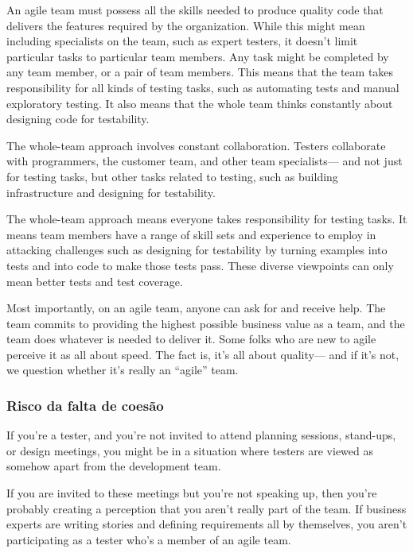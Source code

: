 \documentclass[
	12pt,				%
	openright,			%
	oneside,			%
	a4paper,			%
	english,			%
	brazil,				%
	]{abntex2}
\begin{document}
An agile team must possess all the skills needed to produce quality code that delivers the features required by the organization. While this might mean including specialists on the team, such as expert testers, it doesn’t limit particular tasks to particular team members. Any task might be completed by any team member, or a pair of team members. This means that the team takes responsibility for all kinds of testing tasks, such as automating tests and manual exploratory testing. It also means that the whole team thinks constantly about designing code for testability.

The whole-team approach involves constant collaboration. Testers collaborate with programmers, the customer team, and other team specialists— and not just for testing tasks, but other tasks related to testing, such as building infrastructure and designing for testability.

The whole-team approach means everyone takes responsibility for testing tasks. It means team members have a range of skill sets and experience to employ in attacking challenges such as designing for testability by turning examples into tests and into code to make those tests pass. These diverse viewpoints can only mean better tests and test coverage.

Most importantly, on an agile team, anyone can ask for and receive help. The team commits to providing the highest possible business value as a team, and the team does whatever is needed to deliver it. Some folks who are new to agile perceive it as all about speed. The fact is, it’s all about quality— and if it’s not, we question whether it’s really an “agile” team.

\subsubsection{Risco da falta de coesão}
If you’re a tester, and you’re not invited to attend planning sessions, stand-ups, or design meetings, you might be in a situation where testers are viewed as somehow apart from the development team.

If you are invited to these meetings but you’re not speaking up, then you’re probably creating a perception that you aren’t really part of the team. If business experts are writing stories and defining requirements all by themselves, you aren’t participating as a tester who’s a member of an agile team.
\end{document}
